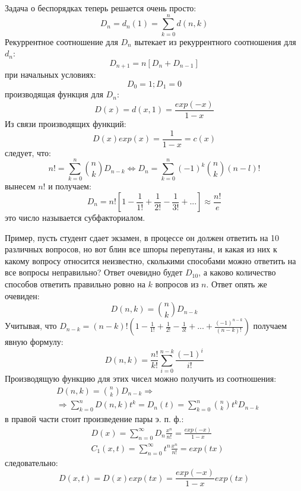 Задача о беспорядках теперь решается очень просто:
\[
	D_n = d_n\left(1\right) = \sum_{k=0}^nd\left(n,k\right)
\]
Рекуррентное соотношение для $D_n$ вытекает из рекуррентного соотношения для $d_n$:
\[
	D_{n+1} = n\left[D_n + D_{n-1}\right]
\]
при начальных условиях:
\[
	D_0 = 1; D_1 = 0
\]
производящая функция для $D_n$:
\[
	D\left(x\right) = d\left(x,1\right) = \frac{exp\left(-x\right)}{1-x}
\]
Из связи производящих функций:
\[
	D\left(x\right) exp\left(x\right) = \frac{1}{1-x} = c\left(x\right)
\]
следует, что:
\[
	n! = \sum_{k=0}^n \binom{n}{k}D_{n-k} \Leftrightarrow D_n = \sum_{k=0}^n \left(-1\right)^k \binom{n}{k} \left(n-l\right)!
\]
вынесем $n!$ и получаем:
\[
	D_n = n! \left[1 - \frac{1}{1!} + \frac{1}{2!} - \frac{1}{3!} + ...\right] \approx \frac{n!}{e}
\]
это число называется субфакториалом.

Пример, пусть студент сдает экзамен, в процессе он должен ответить на 10 различных вопросов, но вот блин все шпоры перепутаны, и какая из них к какому вопросу относится неизвестно, сколькими способами можно ответить на все вопросы неправильно?
Ответ очевидно будет $D_{10}$, а каково количество способов ответить правильно ровно на $k$ вопросов из $n$. Ответ опять же очевиден:
\[
	D\left(n,k\right) = \binom{n}{k} D_{n-k}
\]
Учитывая, что $D_{n-k} = \left(n-k\right)! \left(1 - \frac{1}{1!} + \frac{1}{2!} - \frac{1}{3!} + ... + \frac{\left(-1\right)^{n-k}}{\left(n-k\right)!}\right)$ получаем явную формулу:
\[
	D\left(n,k\right) = \frac{n!}{k!} \sum_{i=0}^{n-k} \frac{\left(-1\right)^i}{i!}
\]
Производящую функцию для этих чисел можно получить из соотношения:
\[
	\begin{split}
		& D\left(n,k\right) = \binom{n}{k} D_{n-k} \Rightarrow\\
		& \Rightarrow \sum_{k=0}^n D\left(n,k\right) t^k = D_n\left(t\right) = \sum_{k=0}^n \binom{n}{k}t^k D_{n-k}
	\end{split}
\]
в правой части стоит произведение пары э. п. ф.:
\[
	\begin{split}
		& D\left(x\right) = \sum_{n=0}^{\infty} D_n \frac{x^n}{n!} = \frac{exp\left(-x\right)}{1-x}\\
		& C_1\left(x,t\right) = \sum_{n=0}^{\infty} t^n \frac{x^n}{n!} = exp\left(tx\right)
	\end{split}
\]
следовательно:
\[
	D\left(x,t\right) = D\left(x\right) exp\left(tx\right) = \frac{exp\left(-x\right)}{1-x} exp\left(tx\right)
\]
